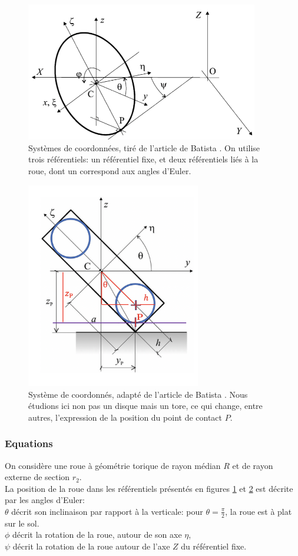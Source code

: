 \begin{figure}[htb]
\centering
\includegraphics[width=4in]{batista/ref1.png}
\caption{Systèmes de coordonnées, tiré de l'article de Batista  \cite{Batista}. On utilise trois référentiels: un référentiel fixe, et deux référentiels liés à la roue, dont un correspond aux angles d'Euler.}
\label{fig:ref1}
\end{figure}

\begin{figure}[htb]
\centering
\includegraphics[width=3in]{batista/ref2.png}
\caption{Système de coordonnés, adapté de l'article de Batista \cite{Batista}. Nous étudions ici non pas un disque mais un tore, ce qui change, entre autres, l'expression de la position du point de contact $P$.}
\label{fig:ref2}
\end{figure}

\subsubsection{Equations}
On considère une roue à géométrie torique de rayon médian $R$ et de rayon externe de section $r_2$.\\
La position de la roue dans les référentiels présentés en figures \ref{fig:ref1} et \ref{fig:ref2} est décrite par les angles d'Euler: \\
$\theta$ décrit son inclinaison par rapport à la verticale: pour $\theta=\frac{\pi}{2}$, la roue est à plat sur le sol. \\
$\phi$ décrit la rotation de la roue, autour de son axe $\eta$, \\
$\psi$ décrit la rotation de la roue autour de l'axe $Z$ du référentiel fixe. \\

